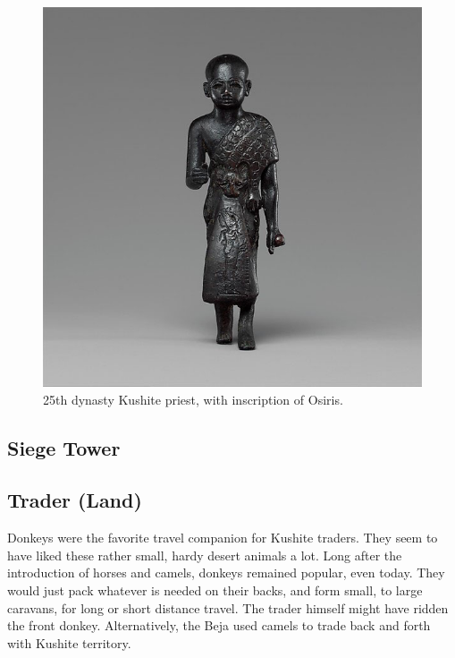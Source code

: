 \documentclass[a4paper,12pt]{scrreprt}
\begin{document}
\begin{figure}[H]
	\centering
	\includegraphics[width=\textwidth]{img/priest/kushite_priest}
	\caption{25th dynasty Kushite priest, with inscription of Osiris.}
\end{figure}

\subsection{Siege Tower}

\subsection{Trader (Land)}

Donkeys were the favorite travel companion for Kushite traders. They seem to have liked these rather small, hardy desert animals a lot. Long after the introduction of horses and camels, donkeys remained popular, even today. They would just pack whatever is needed on their backs, and form small, to large caravans, for long or short distance travel. The trader himself might have ridden the front donkey. Alternatively, the Beja used camels to trade back and forth with Kushite territory.
\end{document}

